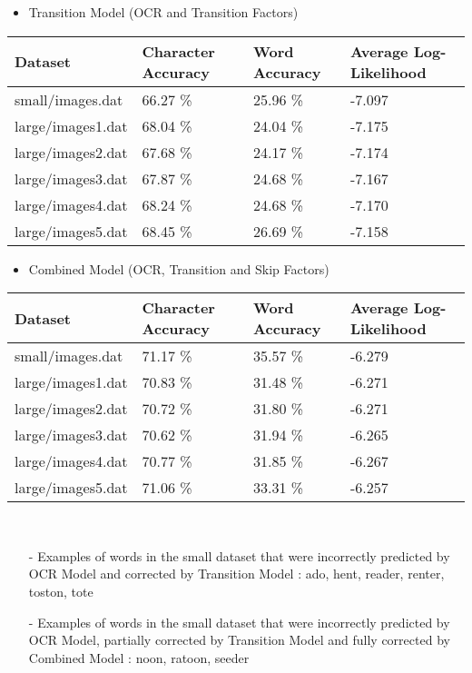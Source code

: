 \documentclass[]{article}
\begin{document}
\newpage
\begin{itemize}[leftmargin=*]
\item Transition Model (OCR and Transition Factors)
\end{itemize}
\begin{center}
\begin{tabu} to \textwidth { | X[c] | X[c] | X[c] | X[c] |}
\hline
 Dataset & Character Accuracy & Word Accuracy & Average Log-Likelihood \\
\hline
small/images.dat & 66.27 \% & 25.96 \% & -7.097\\
\hline
large/images1.dat & 68.04 \% & 24.04 \% & -7.175\\
\hline
large/images2.dat & 67.68 \% & 24.17 \% & -7.174\\
\hline
large/images3.dat & 67.87 \% & 24.68 \% & -7.167\\
\hline
large/images4.dat & 68.24 \% & 24.68 \% & -7.170\\
\hline
large/images5.dat & 68.45 \% & 26.69 \% & -7.158\\
\hline
\end{tabu}
\end{center}
\begin{itemize}[leftmargin=*]
\item Combined Model (OCR, Transition and Skip Factors)
\end{itemize}
\begin{center}
\begin{tabu} to \textwidth { | X[c] | X[c] | X[c] | X[c] |}
\hline
 Dataset & Character Accuracy & Word Accuracy & Average Log-Likelihood \\
\hline
small/images.dat & 71.17 \% & 35.57 \% & -6.279\\
\hline
large/images1.dat & 70.83 \% & 31.48 \% & -6.271\\
\hline
large/images2.dat & 70.72 \% & 31.80 \% & -6.271\\
\hline
large/images3.dat & 70.62 \% & 31.94 \% & -6.265\\
\hline
large/images4.dat & 70.77 \% & 31.85 \% & -6.267\\
\hline
large/images5.dat & 71.06 \% & 33.31 \% & -6.257\\
\hline
\end{tabu}
\end{center}
~\\
\begin{itemize}[leftmargin=*]
\item[-] Examples of words in the small dataset that were incorrectly predicted by OCR Model and corrected by Transition Model : ado, hent, reader, renter, toston, tote
\item[-] Examples of words in the small dataset that were incorrectly predicted by OCR Model, partially corrected by Transition Model and fully corrected by Combined Model : noon, ratoon, seeder
\end{itemize}
\end{document}
